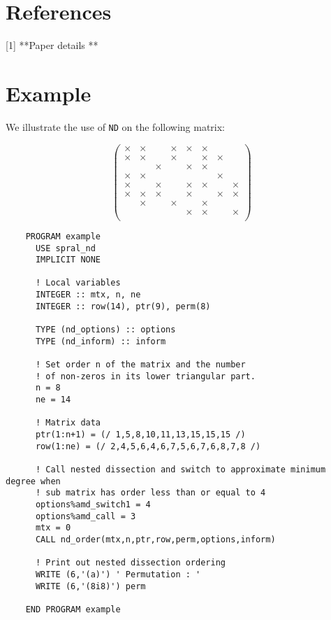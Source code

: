 \section*{References}
[1] **Paper details **




\section{Example}

We illustrate the use of {\tt ND} on the following matrix: 

$$
	\left(\begin{array}{cccccccc}
   \times &  \times  &         &  \times  &  \times  & \times &          &           \\
   \times &  \times  &         &  \times  &          & \times &  \times  &           \\ 
          &          & \times  &          &  \times  & \times &          &           \\
   \times &  \times  &         &          &          &        &  \times  &           \\ 
   \times &          & \times  &          &  \times  & \times &          &   \times  \\ 
   \times &  \times  & \times  &          &  \times  &        &  \times  &   \times  \\ 
          &  \times  &         &  \times  &          & \times &          &           \\ 
          &          &         &          &  \times  & \times &          &   \times  \\ 
	\end{array}\right)
$$


\smallskip

\def\baselinestretch{0.8}
{\small \begin{verbatim}
    PROGRAM example
      USE spral_nd
      IMPLICIT NONE

      ! Local variables
      INTEGER :: mtx, n, ne
      INTEGER :: row(14), ptr(9), perm(8)

      TYPE (nd_options) :: options
      TYPE (nd_inform) :: inform

      ! Set order n of the matrix and the number
      ! of non-zeros in its lower triangular part.
      n = 8 
      ne = 14

      ! Matrix data
      ptr(1:n+1) = (/ 1,5,8,10,11,13,15,15,15 /)
      row(1:ne) = (/ 2,4,5,6,4,6,7,5,6,7,6,8,7,8 /)

      ! Call nested dissection and switch to approximate minimum degree when
      ! sub matrix has order less than or equal to 4
      options%amd_switch1 = 4
      options%amd_call = 3
      mtx = 0
      CALL nd_order(mtx,n,ptr,row,perm,options,inform)

      ! Print out nested dissection ordering
      WRITE (6,'(a)') ' Permutation : '
      WRITE (6,'(8i8)') perm

    END PROGRAM example
\end{verbatim}  }
\def\baselinestretch{1.0}
\medskip

